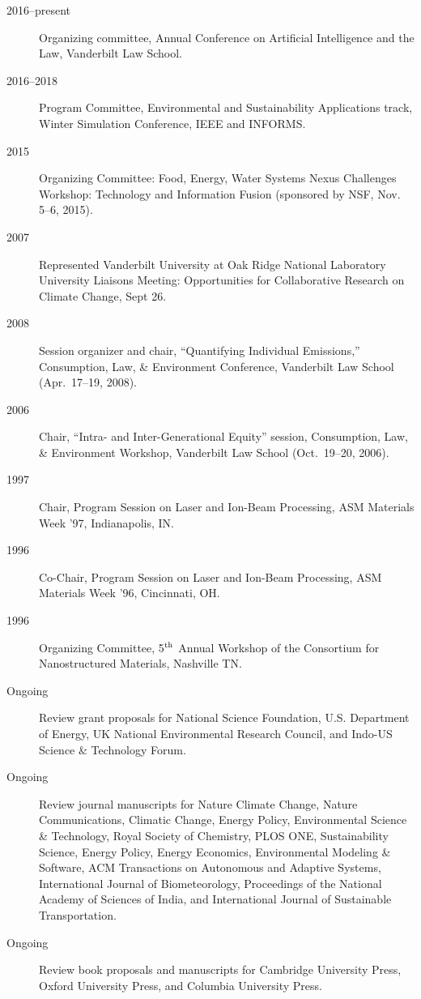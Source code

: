 \documentclass[10pt]{article}
\begin{document}
\begin{description}
            \item[2016--present] Organizing committee, Annual Conference on Artificial Intelligence and the Law, Vanderbilt Law School.
            \item[2016--2018] Program Committee, Environmental and Sustainability Applications track, Winter Simulation Conference, IEEE and INFORMS.
    	    \item[2015] Organizing Committee: Food, Energy, Water Systems Nexus Challenges Workshop: Technology and Information Fusion (sponsored by NSF, Nov. 5--6, 2015).
    		\item[2007] Represented Vanderbilt University at Oak Ridge National Laboratory University Liaisons Meeting: Opportunities for Collaborative Research on Climate Change, Sept 26.
    		\item[2008] Session organizer and chair, ``Quantifying Individual Emissions,'' Consumption, Law, \& Environment Conference, Vanderbilt Law School (Apr.\ 17--19, 2008).
    		\item[2006] Chair, ``Intra- and Inter-Generational Equity'' session, Consumption, Law, \& Environment Workshop, Vanderbilt Law School (Oct.~19--20, 2006).
    		\item[1997] Chair, Program Session on Laser and Ion-Beam Processing, ASM Materials Week '97, In\-di\-an\-a\-po\-lis, IN.
    		\item[1996] Co-Chair, Program Session on Laser and Ion-Beam Processing, ASM Materials Week '96, Cincinnati, OH.
    		\item[1996] Organizing Committee, 5$^{\mbox{\scriptsize th}}$ Annual Workshop of the Consortium for Nanostructured Materials, Nashville TN.
    		\item[Ongoing] Review grant proposals for National Science Foundation, U.S. Department of Energy, UK National Environmental Research Council, and Indo-US Science \& Technology Forum.
    		\item[Ongoing] Review journal manuscripts for 
                Nature Climate Change,
                Nature Communications,
                Climatic Change, 
                Energy Policy, 
                Environmental Science \& Technology,
                Royal Society of Chemistry,
                PLOS ONE,
                Sustainability Science,
                Energy Policy,
                Energy Economics, 
                Environmental Modeling \& Software,
                ACM Transactions on Autonomous and Adaptive Systems,
                International Journal of Biometeorology,
                Proceedings of the National Academy of Sciences of India,
                and
                International Journal of Sustainable Transportation.
    		\item[Ongoing] Review book proposals and manuscripts for Cambridge University Press, Oxford University Press, and Columbia University Press.
        \end{description}
\end{document}
